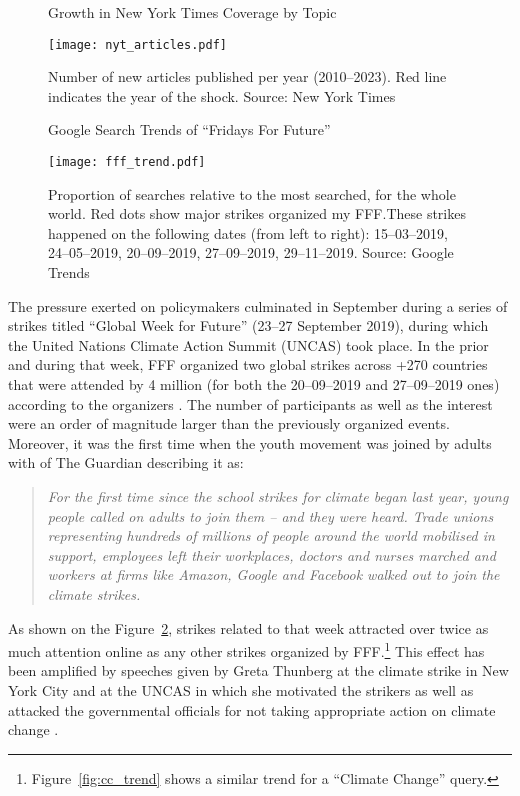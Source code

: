 \documentclass[12pt]{article}
\begin{document}
\begin{figure}[t]
    \caption{Growth in New York Times Coverage by Topic}\label{fig:news_trends}
    \texttt{[image: nyt\_articles.pdf]}
    \captionsetup{font=footnotesize}
    \caption*{Number of new articles published per year (2010--2023). Red line indicates the year of the shock. Source: New York Times}
\end{figure}

\begin{figure}[t]
    \caption{Google Search Trends of ``Fridays For Future''}\label{fig:fff_trend}
    \texttt{[image: fff\_trend.pdf]}
    \captionsetup{font=footnotesize}
    \caption*{Proportion of searches relative to the most searched, for the whole world. Red dots show major strikes organized my FFF.\@ These strikes happened on the following dates (from left to right): 15--03--2019, 24--05--2019, 20--09--2019, 27--09--2019, 29--11--2019. Source: Google Trends}
\end{figure}

The pressure exerted on policymakers culminated in September during a series of strikes titled ``Global Week for Future'' (23--27 September 2019), during which the United Nations Climate Action Summit (UNCAS) took place. In the prior and during that week, FFF organized two global strikes across +270 countries that were attended by 4 million (for both the 20--09--2019 and 27--09--2019 ones) according to the organizers \parencite{fffStrikeStats}. The number of participants as well as the interest were an order of magnitude larger than the previously organized events. Moreover, it was the first time when the youth movement was joined by adults with \citeauthor{watts2019climate} of The Guardian describing it as:

\begin{quote}
    \small
    \textit{For the first time since the school strikes for climate began last year, young people called on adults to join them – and they were heard. Trade unions representing hundreds of millions of people around the world mobilised in support, employees left their workplaces, doctors and nurses marched and workers at firms like Amazon, Google and Facebook walked out to join the climate strikes.} \parencite{watts2019climate}
\end{quote}

As shown on the Figure~\ref{fig:fff_trend}, strikes related to that week attracted over twice as much attention online as any other strikes organized by FFF.\footnote{Figure~\ref{fig:cc_trend} shows a similar trend for a ``Climate Change'' query.} This effect has been amplified by speeches given by Greta Thunberg at the climate strike in New York City and at the UNCAS in which she motivated the strikers as well as attacked the governmental officials for not taking appropriate action on climate change \parencite{2019thunberg}. 
\end{document}
